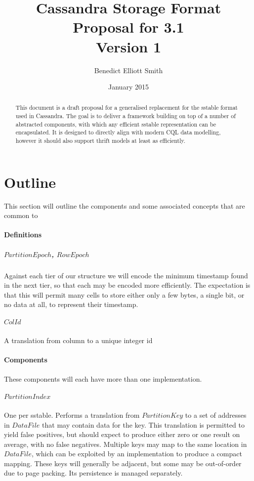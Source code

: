 \documentclass[fleqn]{article}
\title{Cassandra Storage Format\\Proposal for 3.1\\Version 1}
\author{Benedict Elliott Smith}
\date{January 2015}
\begin{document}
\maketitle

\begin{abstract}
This document is a draft proposal for a generalised replacement for the sstable format used in Cassandra.
The goal is to deliver a framework building on top of a number of abstracted components, with which
any efficient sstable representation can be encapsulated. It is designed to directly align with modern CQL
data modelling, however it should also support thrift models at least as efficiently.
\end{abstract}

\small

\section{Outline}
This section will outline the components and some associated concepts that are common to
\\
\paragraph{Definitions}
\subparagraph{$PartitionEpoch$, $RowEpoch$}
\subparagraph{}
    Against each tier of our structure we will encode the minimum timestamp found in the next
    tier, so that each may be encoded more efficiently. The expectation is that this will permit 
    many cells to store either only a few bytes, a single bit, or no data at all, to represent their timestamp.
\subparagraph{$ColId$}
\subparagraph{}
    A translation from column to a unique integer id

\paragraph{Components}
\paragraph{}
These components will each have more than one implementation.
\subparagraph{$PartitionIndex$}
\subparagraph{}
    One per sstable.
    Performs a translation from $PartitionKey$ to a set of addresses in $DataFile$ that may contain
    data for the key. This translation is permitted to yield false positives, but should
    expect to produce either zero or one result on average, with no false negatives.
    Multiple keys may map to the same location in $DataFile$, which can be exploited by an implementation
    to produce a compact mapping. These keys will generally be adjacent, but some may be out-of-order
    due to page packing. Its persistence is managed separately.
    \\
\end{document}
